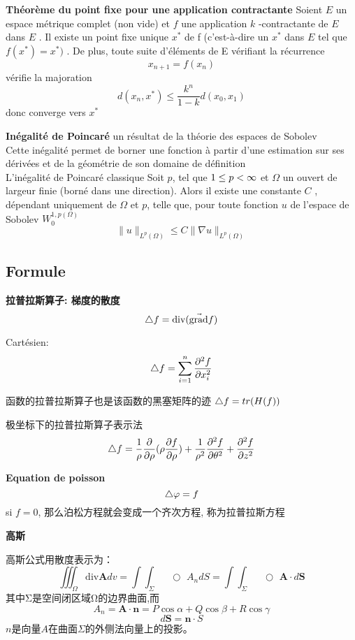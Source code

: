 \textbf{Th\'eor\`eme du point fixe pour une application contractante}\newline
Soient $ E$  un espace m\'etrique complet (non vide) et $ f$  une application $ k$ -contractante de $ E$  dans $ E$ . Il existe un point fixe unique $x^*$ de f (c'est-\`a-dire un $x^*$ dans $ E$  tel que $ f(x^* ) = x^*)$ . De plus, toute suite d'\'el\'ements de E v\'erifiant la r\'ecurrence
$$x_{n+1}=f(x_n)$$
v\'erifie la majoration
$$d(x_n,x^*) \le \frac {k^n}{1-k} d(x_0,x_1)$$
donc converge vers $x^*$
\bigskip

\textbf{In\'egalit\'e de Poincar\'e}
un r\'esultat de la th\'eorie des espaces de Sobolev\\
Cette in\'egalit\'e permet de borner une fonction \`a partir d'une estimation sur ses d\'eriv\'ees et de la g\'eom\'etrie de son domaine de d\'efinition\\
L'in\'egalit\'e de Poincar\'e classique
Soit $p$, tel que $ 1 \leq p < \infty$  et $\Omega$ un ouvert de largeur finie (born\'e dans une direction). Alors il existe une constante  $  C$  , d\'ependant uniquement de $\Omega$ et $p$, telle que, pour toute fonction $u$   de l'espace de Sobolev $W_0^{1,p(\Omega)}$
$$
\| u \|_{L^{p} (\Omega)} \leq C \| \nabla u \|_{L^{p} (\Omega)}
$$

\subsection{Formule}
\textbf{拉普拉斯算子: 梯度的散度}
$$\mathop{}\!\mathbin\bigtriangleup f = \mbox{div} (\vec{\mbox{grad}}f)$$

Cart\'esien: $$\mathop{}\!\mathbin\bigtriangleup f = \sum_{i=1}^n \frac{\partial^2 f }{\partial x_i^2} $$

函数的拉普拉斯算子也是该函数的黑塞矩阵的迹 $\mathop{}\!\mathbin\bigtriangleup f = tr(H(f))$

极坐标下的拉普拉斯算子表示法
$$\mathop{}\!\mathbin\bigtriangleup f = \frac{ 1}{\rho}\frac{\partial  }{\partial \rho}(\rho \frac{\partial  f}{\partial \rho}) + \frac{ 1}{\rho^2}\frac{\partial ^2 f}{\partial\theta^2} + \frac{\partial^2 f}{\partial z^2}$$

\bigskip
\textbf{Equation de poisson}
$$\mathop{}\!\mathbin\bigtriangleup \varphi = f$$
si $f=0$, 那么泊松方程就会变成一个齐次方程, 称为拉普拉斯方程

\bigskip
\textbf{高斯}

高斯公式用散度表示为：
$$
\iiint_{\Omega}\mathrm{div}\mathbf{A}dv=
\int\!\!\!\!\int_{\Sigma}\!\!\!\!\!\!\!\!\!\!\!\!\!\!\;\;\;\bigcirc\,\,A_{n}dS
=
\int\!\!\!\!\int_{\Sigma}\!\!\!\!\!\!\!\!\!\!\!\!\!\!\;\;\;\bigcirc\,\,\mathbf{A}\cdot d\mathbf{S}
$$
其中Σ是空间闭区域Ω的边界曲面,而
$$
A_n=\mathbf{A}\cdot\mathbf{n}=P\cos\alpha+Q\cos\beta+R\cos\gamma
$$
$$
d\mathbf{S}=\mathbf{n}\cdot S
$$
$n$是向量$A$在曲面$\Sigma$的外侧法向量上的投影。

